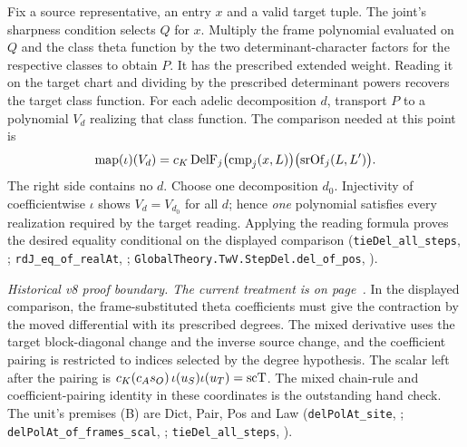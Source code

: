 Fix a source representative, an entry \(x\) and a valid target tuple. The joint's sharpness condition selects \(Q\) for \(x\). Multiply the frame polynomial evaluated on \(Q\) and the class theta function by the two determinant-character factors for the respective classes to obtain \(P\). It has the prescribed extended weight. Reading it on the target chart and dividing by the prescribed determinant powers recovers the target class function. For each adelic decomposition \(d\), transport \(P\) to a polynomial \(V_d\) realizing that class function. The comparison needed at this point is
\[
 {\rm map}(\iota)(V_d)
 =c_K\,{\rm DelF}_j\bigl({\rm cmp}_j(x,L)\bigr)
                 \bigl({\rm srOf}_j(L,L')\bigr).
\]
The right side contains no \(d\). Choose one decomposition \(d_0\). Injectivity of coefficientwise \(\iota\) shows \(V_d=V_{d_0}\) for all \(d\); hence \emph{one} polynomial satisfies every realization required by the target reading. Applying the reading formula proves the desired equality conditional on the displayed comparison (\nolinkurl{tieDel_all_steps}, ; \nolinkurl{rdJ_eq_of_realAt}, ; \nolinkurl{GlobalTheory.TwV.StepDel.del_of_pos}, ).

\emph{Historical v8 proof boundary. The current treatment is on page~\pageref{r8:Z4.2.11}.} In the displayed comparison, the frame-substituted theta coefficients must give the contraction by the moved differential with its prescribed degrees. The mixed derivative uses the target block-diagonal change and the inverse source change, and the coefficient pairing is restricted to indices selected by the degree hypothesis. The scalar left after the pairing is \(c_K(c_A s_O)\,\iota(u_S)\iota(u_T)={\rm scT}\). The mixed chain-rule and coefficient-pairing identity in these coordinates is the outstanding hand check. The unit's premises (B) are Dict, Pair, Pos and Law (\nolinkurl{delPolAt_site}, ; \nolinkurl{delPolAt_of_frames_scal}, ; \nolinkurl{tieDel_all_steps}, ).

